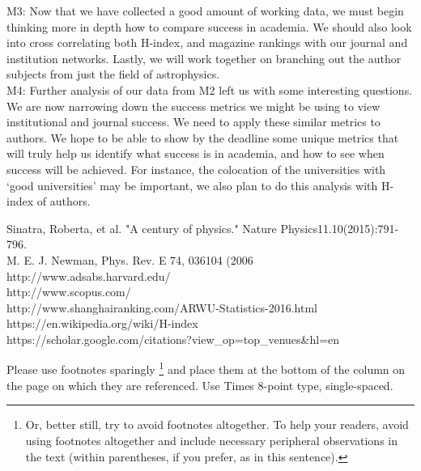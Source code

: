 \documentclass[times, 10pt,twocolumn]{article}
\begin{document}
M3: Now that we have collected a good amount of working data, we must begin thinking more in depth how to compare success in academia. We should also look into cross correlating both H-index, and magazine rankings with our journal and institution networks. Lastly, we will work together on branching out the author subjects from just the field of astrophysics. \\

M4: Further analysis of our data from M2 left us with some interesting questions. We are now narrowing down the success metrics we might be using to view institutional and journal success. We need to apply these similar metrics to authors. We hope to be able to show by the deadline some unique metrics that will truly help us identify what success is in academia, and how to see when success will be achieved. For instance, the colocation of the universities with ‘good universities’ may be important, we also plan to do this analysis with  H-index of authors.

\relax\noindent
 [1] Sinatra, Roberta, et al. "A century of physics." Nature Physics11.10(2015):791-796.\\
\relax
 [2] M. E. J. Newman, Phys. Rev. E 74, 036104 (2006\\
\relax
 [3] http://www.adsabs.harvard.edu/\\
\relax
 [4] http://www.scopus.com/\\
\relax
 [5] http://www.shanghairanking.com/ARWU-Statistics-2016.html\\
\relax
 [6] https://en.wikipedia.org/wiki/H-index\\
\relax
 [7] https://scholar.google.com/citations?view\_op=top\_venues\&hl=en\\


Please use footnotes sparingly%
\footnote
   {%
     Or, better still, try to avoid footnotes altogether.  To help your
     readers, avoid using footnotes altogether and include necessary
     peripheral observations in the text (within parentheses, if you
     prefer, as in this sentence).
   }
and place them at the bottom of the column on the page on which they are
referenced. Use Times 8-point type, single-spaced.


\nocite{ex1,ex2}


\end{document}
